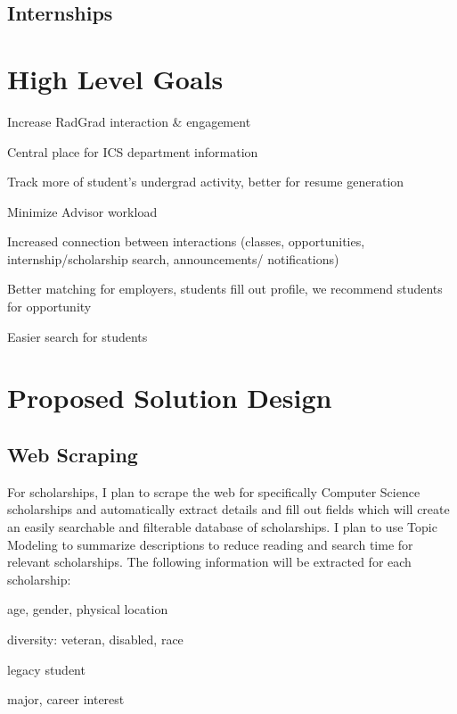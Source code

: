 \documentclass[english]{proposalnsf}
\begin{document}
	
	\subsection{Internships}
	

	
	\section{High Level Goals}
	\label{Goals}
				\begin{Goals }
		\item Increase RadGrad interaction \& engagement
		\item Central place for ICS department information
		\item Track more of student's undergrad activity, better for resume generation
		\item Minimize Advisor workload
		\item  Increased connection between interactions (classes, opportunities, internship/scholarship search, announcements/ notifications)
		\item  Better matching for employers, students fill out profile, we recommend students for opportunity
		\item Easier search for students
	\end{Goals }
	
	
	
	
	\section{Proposed Solution Design}
	\label{solution-design}
	
		\subsection{Web Scraping}
		For scholarships, I plan to scrape the web for specifically Computer Science scholarships and automatically extract details and fill out fields which will create an easily searchable and filterable database of scholarships. I plan to use Topic Modeling to summarize descriptions to reduce reading and search time for relevant scholarships. The following information will be extracted for each scholarship:
		\begin{Demographic Requirements}
			\item age, gender, physical location
			\item diversity: veteran, disabled, race
			\item legacy student
			\item major, career interest
		\end{Demographic Requirements}
	
\end{document}
